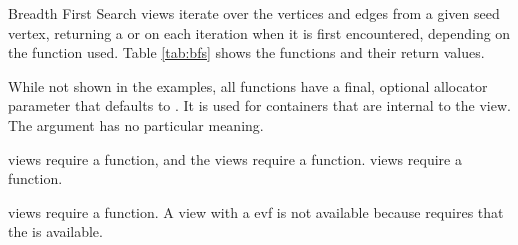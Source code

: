 Breadth First Search views iterate over the vertices and edges from a given seed vertex, returning a  
or  on each iteration when it is first encountered, depending on the function used. 
Table \ref{tab:bfs} shows the functions and their return values.

While not shown in the examples, all functions have a final, optional allocator parameter that defaults to . It is used for containers that are internal to the view. The  argument has no particular meaning.

 views require a  function, and the  views require a  function.
 views require a  function.

 views require a  function. 
A  view with a evf is not available because  requires that the  is available.


